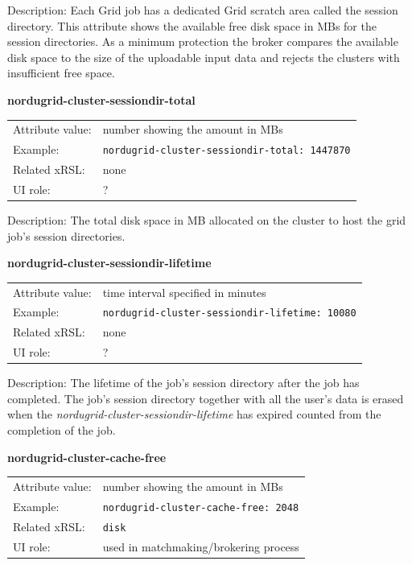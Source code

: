 \documentclass{article}
\begin{document}
Description:  Each Grid job has a dedicated Grid scratch area called the 
session directory. This attribute shows the available free disk space in MBs for the 
session directories. As a minimum protection the broker compares the available 
disk space to the size of the uploadable input data and rejects the clusters 
with insufficient free space.


  \hspace*{0.5cm}
  \begin{shaded}
    \textbf{nordugrid-cluster-sessiondir-total}
  \end{shaded}
  \begin{tabular}{lp{10cm}}  
    Attribute value:& number showing the amount in MBs\\
    Example: &\verb#nordugrid-cluster-sessiondir-total: 1447870#\\
    Related xRSL:& none\\
    UI role:& ?\\
  \end{tabular}

Description: The total disk space in MB allocated on the cluster to host the 
grid job's session directories.

  \hspace*{0.5cm}
  \begin{shaded}
    \textbf{nordugrid-cluster-sessiondir-lifetime}
  \end{shaded}
  \begin{tabular}{lp{10cm}}  
    Attribute value:& time interval specified in minutes\\
    Example: &\verb#nordugrid-cluster-sessiondir-lifetime: 10080#\\
    Related xRSL:& none\\
    UI role:& ?\\
  \end{tabular}

Description: The lifetime of the job's session directory after the job has completed.
The job's session directory together with all the user's data is erased when the 
{\it nordugrid-cluster-sessiondir-lifetime} has expired counted from the completion of the 
job.


  \hspace*{0.5cm}
  \begin{shaded}
    \textbf{nordugrid-cluster-cache-free}
  \end{shaded}
  \begin{tabular}{lp{10cm}}  
    Attribute value:&  number showing the amount in MBs\\
    Example: & \verb#nordugrid-cluster-cache-free: 2048#\\
    Related xRSL:& \verb#disk#\\
    UI role:& used in matchmaking/brokering process\\
  \end{tabular}
\end{document}
